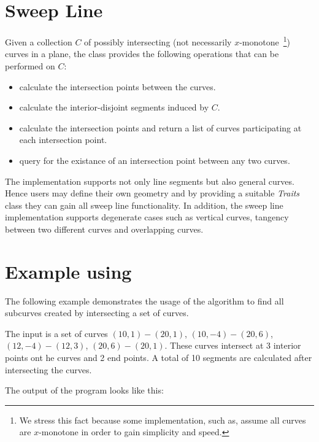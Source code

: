 \section{Sweep Line}


Given a collection $C$ of possibly intersecting 
(not necessarily $x$-monotone~\footnote{
We stress this fact because some implementation, such as, 
 assume all curves are $x$-monotone 
in order to gain simplicity and speed.}) 
curves in a plane, the  class provides the following 
operations that can be performed on $C$:

\begin{itemize}
\item calculate the intersection points between the curves.
\item calculate the interior-disjoint segments induced by $C$.
\item calculate the intersection points and return a list of curves 
participating at each intersection point.
\item query for the existance of an intersection point between any two curves.
\end{itemize}


The  implementation supports not only line segments 
but also 
general curves. Hence users may define their own geometry and by providing a 
suitable {\em Traits} class they can gain all sweep line functionality. 
In addition, the sweep line implementation supports degenerate cases such as  
vertical curves, tangency between two different curves and overlapping curves. 

 

\section{Example using }
\label{ssec:example1_sweep}
The following example demonstrates the usage of the 
 algorithm to find all subcurves created by 
intersecting a set of curves.

The input is a set of curves $(10,1)-(20,1)$, $(10,-4)-(20,6)$,
$(12,-4)-(12,3)$, $(20,6)-(20,1)$. These curves intersect at 3 
interior points ont he curves and 2 end points. A total of 10 
segments are calculated after intersecting the curves.


The output of the program looks like this:








